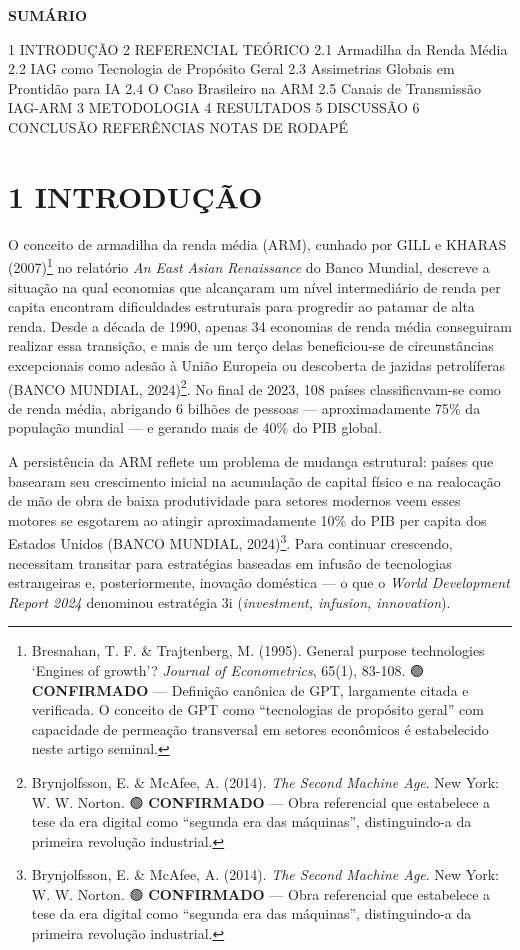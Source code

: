 \documentclass[
  brazilian,
  12pt,
]{article}
\begin{document}
\textbf{SUMÁRIO}

1 INTRODUÇÃO
2 REFERENCIAL TEÓRICO
2.1 Armadilha da Renda Média
2.2 IAG como Tecnologia de Propósito Geral
2.3 Assimetrias Globais em Prontidão para IA
2.4 O Caso Brasileiro na ARM
2.5 Canais de Transmissão IAG-ARM
3 METODOLOGIA
4 RESULTADOS
5 DISCUSSÃO
6 CONCLUSÃO
REFERÊNCIAS
NOTAS DE RODAPÉ

\newpage

\section{1 INTRODUÇÃO}\label{introduuxe7uxe3o}

O conceito de armadilha da renda média (ARM), cunhado por GILL e KHARAS (2007)\footnote{Bresnahan, T. F. \& Trajtenberg, M. (1995). General purpose technologies `Engines of growth'? \emph{Journal of Econometrics}, 65(1), 83-108. 🟢 \textbf{CONFIRMADO} --- Definição canônica de GPT, largamente citada e verificada. O conceito de GPT como ``tecnologias de propósito geral'' com capacidade de permeação transversal em setores econômicos é estabelecido neste artigo seminal.} no relatório \emph{An East Asian Renaissance} do Banco Mundial, descreve a situação na qual economias que alcançaram um nível intermediário de renda per capita encontram dificuldades estruturais para progredir ao patamar de alta renda. Desde a década de 1990, apenas 34 economias de renda média conseguiram realizar essa transição, e mais de um terço delas beneficiou-se de circunstâncias excepcionais como adesão à União Europeia ou descoberta de jazidas petrolíferas (BANCO MUNDIAL, 2024)\footnote{Brynjolfsson, E. \& McAfee, A. (2014). \emph{The Second Machine Age}. New York: W. W. Norton. 🟢 \textbf{CONFIRMADO} --- Obra referencial que estabelece a tese da era digital como ``segunda era das máquinas'', distinguindo-a da primeira revolução industrial.}. No final de 2023, 108 países classificavam-se como de renda média, abrigando 6 bilhões de pessoas --- aproximadamente 75\% da população mundial --- e gerando mais de 40\% do PIB global.

A persistência da ARM reflete um problema de mudança estrutural: países que basearam seu crescimento inicial na acumulação de capital físico e na realocação de mão de obra de baixa produtividade para setores modernos veem esses motores se esgotarem ao atingir aproximadamente 10\% do PIB per capita dos Estados Unidos (BANCO MUNDIAL, 2024)\footnote{Brynjolfsson, E. \& McAfee, A. (2014). \emph{The Second Machine Age}. New York: W. W. Norton. 🟢 \textbf{CONFIRMADO} --- Obra referencial que estabelece a tese da era digital como ``segunda era das máquinas'', distinguindo-a da primeira revolução industrial.}. Para continuar crescendo, necessitam transitar para estratégias baseadas em infusão de tecnologias estrangeiras e, posteriormente, inovação doméstica --- o que o \emph{World Development Report 2024} denominou estratégia 3i (\emph{investment, infusion, innovation}).
\end{document}

